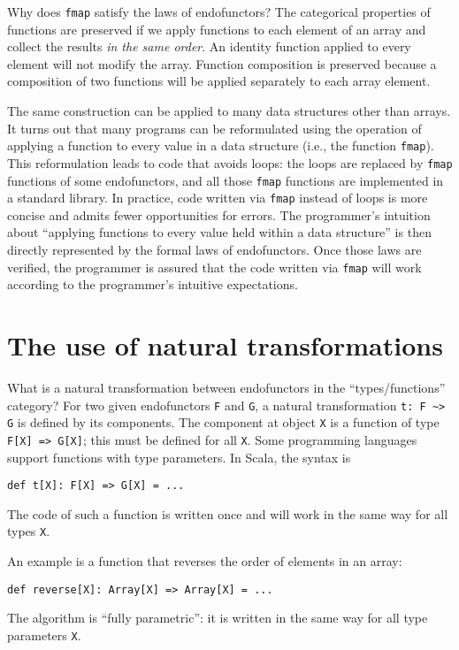 Why does \lstinline!fmap! satisfy the laws of endofunctors? The categorical
properties of functions are preserved if we apply functions to each
element of an array and collect the results \emph{in the same order}.
An identity function applied to every element will not modify the
array. Function composition is preserved because a composition of
two functions will be applied separately to each array element.

The same construction can be applied to many data structures other
than arrays. It turns out that many programs can be reformulated using
the operation of applying a function to every value in a data structure
(i.e., the function \lstinline!fmap!). This reformulation leads to
code that avoids loops: the loops are replaced by \lstinline!fmap!
functions of some endofunctors, and all those \lstinline!fmap! functions
are implemented in a standard library. In practice, code written via
\lstinline!fmap! instead of loops is more concise and admits fewer
opportunities for errors. The programmer\textsf{'}s intuition about \textsf{``}applying
functions to every value held within a data structure\textsf{''} is then directly
represented by the formal laws of endofunctors. Once those laws are
verified, the programmer is assured that the code written via \lstinline!fmap!
will work according to the programmer\textsf{'}s intuitive expectations.

\section{The use of natural transformations}

What is a natural transformation between endofunctors in the \textsf{``}types/functions\textsf{''}
category? For two given endofunctors \lstinline!F! and \lstinline!G!,
a natural transformation \lstinline!t: F ~> G! is defined by its
components. The component at object \lstinline!X! is a function of
type \lstinline!F[X] => G[X]!; this must be defined for all \lstinline!X!.
Some programming languages support functions with type parameters.
In Scala, the syntax is
\begin{lstlisting}
def t[X]: F[X] => G[X] = ...
\end{lstlisting}
The code of such a function is written once and will work in the same
way for all types \lstinline!X!.

An example is a function that reverses the order of elements in an
array:
\begin{lstlisting}
def reverse[X]: Array[X] => Array[X] = ...
\end{lstlisting}
The algorithm is \textsf{``}fully parametric\textsf{''}: it is written in the same
way for all type parameters \lstinline!X!.

